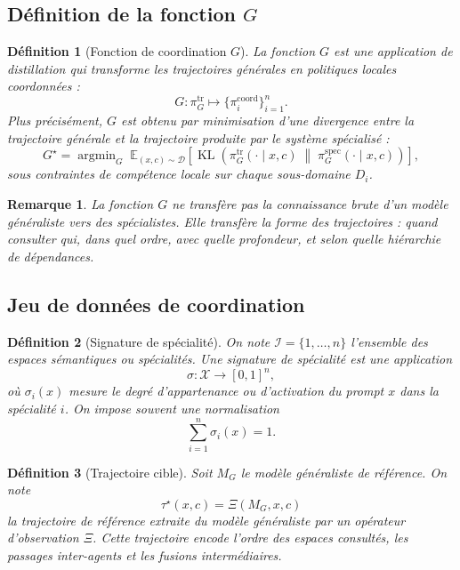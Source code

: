 \documentclass[11pt,a4paper]{article}
\newtheorem{definition}{Définition}[section]
\newtheorem{remark}{Remarque}[section]
\DeclareMathOperator{\argmin}{argmin}
\DeclareMathOperator{\KL}{KL}
\newcommand{\X}{\mathcal X}
\newcommand{\I}{\mathcal I}
\newcommand{\1}{\mathbf 1}
\begin{document}
\subsection{Définition de la fonction \(G\)}

\begin{definition}[Fonction de coordination \(G\)]
La fonction \(G\) est une application de distillation qui transforme les trajectoires générales en politiques locales coordonnées :
\[
G:\pi_G^{\mathrm{tr}}\longmapsto \{\pi_i^{\mathrm{coord}}\}_{i=1}^n.
\]
Plus précisément, \(G\) est obtenu par minimisation d'une divergence entre la trajectoire générale et la trajectoire produite par le système spécialisé :
\[
G^\star
=
\argmin_{G}
\;
\mathbb E_{(x,c)\sim \mathcal D}
\left[
\KL\!\left(
\pi_G^{\mathrm{tr}}(\cdot\mid x,c)
\;\middle\|\;
\pi_{G}^{\mathrm{spec}}(\cdot\mid x,c)
\right)
\right],
\]
sous contraintes de compétence locale sur chaque sous-domaine \(D_i\).
\end{definition}

\begin{remark}
La fonction \(G\) ne transfère pas la connaissance brute d'un modèle généraliste vers des spécialistes.
Elle transfère la \emph{forme des trajectoires} : quand consulter qui, dans quel ordre, avec quelle profondeur, et selon quelle hiérarchie de dépendances.
\end{remark}

\subsection{Jeu de données de coordination}

\begin{definition}[Signature de spécialité]
On note \(\I=\{1,\dots,n\}\) l'ensemble des espaces sémantiques ou spécialités.
Une signature de spécialité est une application
\[
\sigma:\X\to [0,1]^n,
\]
où \(\sigma_i(x)\) mesure le degré d'appartenance ou d'activation du prompt \(x\)
dans la spécialité \(i\).
On impose souvent une normalisation
\[
\sum_{i=1}^n \sigma_i(x)=1.
\]
\end{definition}

\begin{definition}[Trajectoire cible]
Soit \(M_G\) le modèle généraliste de référence.
On note
\[
\tau^\star(x,c)
=
\Xi(M_G,x,c)
\]
la trajectoire de référence extraite du modèle généraliste par un opérateur d'observation \(\Xi\).
Cette trajectoire encode l'ordre des espaces consultés, les passages inter-agents et les fusions intermédiaires.
\end{definition}
\end{document}
